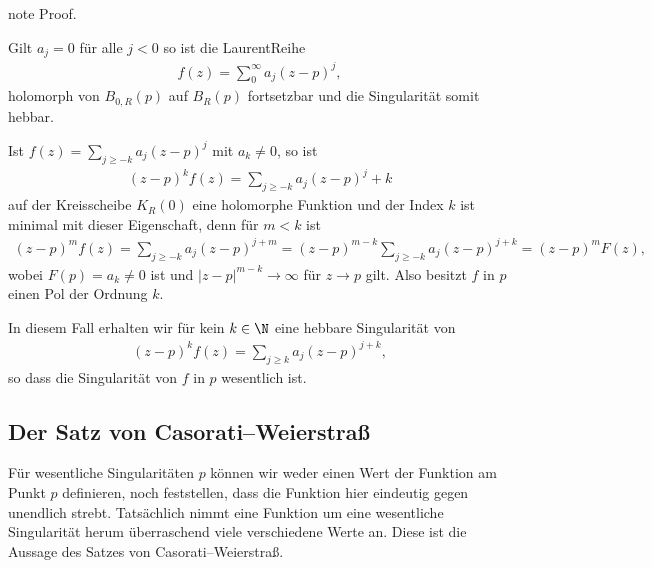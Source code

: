 \documentclass[letterpaper,10pt,german]{jupyterBook}
\begin{document}
\begin{sphinxadmonition}{note}
\sphinxAtStartPar
Proof. 

\sphinxAtStartPar
Gilt \(a_j=0\) für alle \(j<0\) so ist die Laurent\sphinxhyphen{}Reihe
\begin{equation*}
\begin{split}f(z) = \sum_{0}^\infty a_j (z-p)^j,\end{split}
\end{equation*}
\sphinxAtStartPar
holomorph von \(B_{0,R}(p)\) auf \(B_R(p)\) fortsetzbar und die Singularität somit hebbar.

\sphinxAtStartPar
{}

\sphinxAtStartPar
Ist \(f(z) = \sum_{j \geq -k} a_j (z-p)^j\) mit \(a_k \neq 0\), so ist
\begin{equation*}
\begin{split}(z-p)^k f(z) = \sum_{j \geq -k} a_j (z-p)^j+k\end{split}
\end{equation*}
\sphinxAtStartPar
auf der Kreisscheibe \(K_R(0)\) eine holomorphe Funktion und der Index \(k\) ist minimal mit dieser Eigenschaft, denn für \(m < k\) ist
\begin{equation*}
\begin{split}(z-p)^m f(z) = \sum_{j \geq -k} a_j (z-p)^{j+m} = (z-p)^{m-k} \sum_{j \geq -k} a_j (z-p)^{j+k} = (z-p)^m F(z),\end{split}
\end{equation*}
\sphinxAtStartPar
wobei \(F(p) = a_k \neq 0\) ist und \(|z-p|^{m-k} \rightarrow \infty\) für \(z \rightarrow p\) gilt.
Also besitzt \(f\) in \(p\) einen Pol der Ordnung \(k\).

\sphinxAtStartPar
{}

\sphinxAtStartPar
In diesem Fall erhalten wir für kein \(k \in \N\) eine hebbare Singularität von
\begin{equation*}
\begin{split}(z-p)^k f(z) = \sum_{j \geq k} a_j (z-p)^{j+k},\end{split}
\end{equation*}
\sphinxAtStartPar
so dass die Singularität von \(f\) in \(p\) wesentlich ist.
\end{sphinxadmonition}


\subsection{Der Satz von Casorati–Weierstraß}
\label{\detokenize{complexanalysis/residuensatz:der-satz-von-casorati-weierstrasz}}
\sphinxAtStartPar
Für wesentliche Singularitäten \(p\) können wir weder einen Wert der Funktion am Punkt \(p\) definieren, noch feststellen, dass die Funktion hier eindeutig gegen unendlich strebt. Tatsächlich nimmt eine Funktion um eine wesentliche Singularität herum überraschend viele verschiedene Werte an. Diese ist die Aussage des Satzes von Casorati–Weierstraß.
\end{document}
